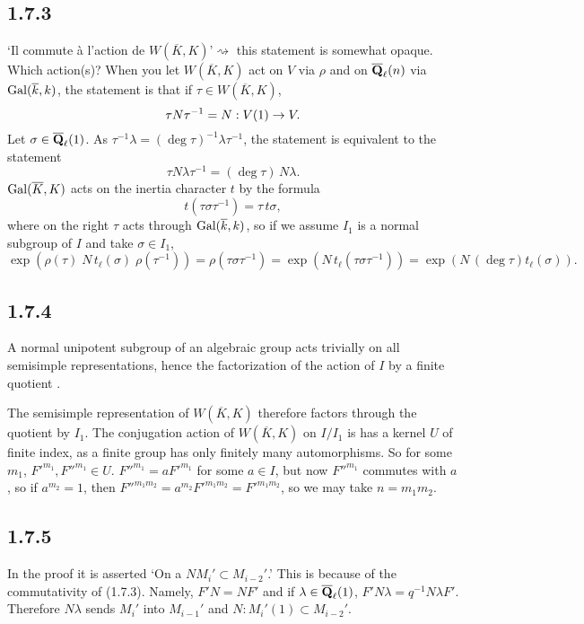 \documentclass[deligne.tex]{subfiles}
\begin{document}
\subsection*{1.7.3} `Il commute à l'action de
$W(\overline K,K)$'$\rightsquigarrow$ this statement is somewhat opaque.
Which action(s)? When you let $W(\overline K,K)$ act on $V$ via $\rho$ and
on $\overline{\mathbf{Q}}_\ell(n)$ via $\operatorname{Gal}(\overline k,k)$, the statement is that
if $\tau\in W(\overline K,K)$,
\begin{equation*}\tau N\tau^{-1}=N:V(1)\rightarrow V.\end{equation*}
Let $\sigma\in\overline{\mathbf{Q}}_\ell(1)$.
As $\tau^{-1}\lambda=(\deg\tau)^{-1}\lambda\tau^{-1}$, the statement is 
equivalent to the statement
\begin{equation*}
	\tau N\lambda\tau^{-1}=(\deg\tau)\,N\lambda.
\end{equation*}
$\operatorname{Gal}(\overline K,K)$ acts on the inertia character $t$ by the formula
\begin{equation*}
	t(\tau\sigma\tau^{-1})=\tau\,t\sigma,
\end{equation*}
where on the right $\tau$ acts through $\operatorname{Gal}(\overline k,k)$, so if
we assume $I_1$ is a normal subgroup of $I$ and take $\sigma\in I_1$,
\begin{equation*}
	\exp(\rho(\tau)\;N\,t_\ell(\sigma)\;\rho(\tau^{-1}))
	=\rho(\tau\sigma\tau^{-1})=\exp(N\,t_\ell(\tau\sigma\tau^{-1}))
	=\exp(N\,(\deg\tau)t_\ell(\sigma)).
\end{equation*}


\subsection*{1.7.4} A normal unipotent subgroup of an algebraic group
acts trivially on all semisimple representations, hence the factorization
of the action of $I$ by a finite quotient \cite[19.16]{Milne}.

The semisimple representation of $W(\overline K,K)$ therefore factors
through the quotient by $I_1$. The conjugation action of $W(\overline K,K)$
on $I/I_1$ is has a kernel $U$ of finite index, as a finite group 
has only finitely many automorphisms. So for some $m_1$,
$F'^{m_1},F''^{m_1}\in U$. $F''^{m_1}=aF'^{m_1}$ for some $a\in I$, but now
$F''^{m_1}$ commutes with $a$, so if $a^{m_2}=1$, then
$F''^{m_1m_2}=a^{m_2}F'^{m_1m_2}=F'^{m_1m_2}$, so we may take $n=m_1m_2$.

\subsection*{1.7.5}
In the proof it is asserted `On a $NM_i'\subset M_{i-2}'$.' This is because
of the commutativity of (1.7.3). Namely, $F'N=NF'$ and if
$\lambda\in\overline{\mathbf{Q}}_\ell(1)$, $F'N\lambda=q^{-1}N\lambda F'$.
Therefore $N\lambda$ sends $M_i'$ into $M_{i-1}'$ and
$N:M_i'(1)\subset M_{i-2}'$.
\end{document}
